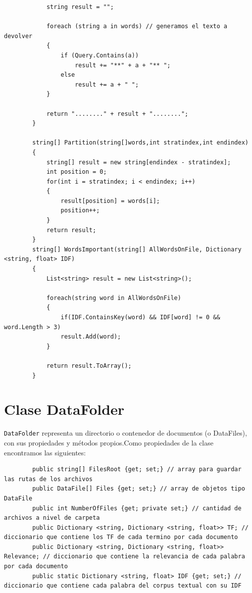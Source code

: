 \documentclass[12pt,a4paper]{report}
\begin{document}
\begin{lstlisting}
            string result = "";

            foreach (string a in words) // generamos el texto a devolver
            {
                if (Query.Contains(a))
                    result += "**" + a + "** ";
                else
                    result += a + " ";
            }

            return "........" + result + "........";
        } 

        string[] Partition(string[]words,int stratindex,int endindex)
        {
            string[] result = new string[endindex - stratindex];
            int position = 0;
            for(int i = stratindex; i < endindex; i++)
            {
                result[position] = words[i];
                position++;
            }
            return result;
        }
        string[] WordsImportant(string[] AllWordsOnFile, Dictionary <string, float> IDF)
        {
            List<string> result = new List<string>();

            foreach(string word in AllWordsOnFile)
            {   
                if(IDF.ContainsKey(word) && IDF[word] != 0 && word.Length > 3)
                result.Add(word);
            }

            return result.ToArray();
        }

\end{lstlisting}

\chapter*{Clase DataFolder}

\texttt{DataFolder} representa un directorio o contenedor de documentos (o DataFiles), con sus propiedades y métodos propios.Como propiedades de la clase encontramos las siguientes:

\begin{lstlisting}
        public string[] FilesRoot {get; set;} // array para guardar las rutas de los archivos
        public DataFile[] Files {get; set;} // array de objetos tipo DataFile
        public int NumberOfFiles {get; private set;} // cantidad de archivos a nivel de carpeta
        public Dictionary <string, Dictionary <string, float>> TF; // diccionario que contiene los TF de cada termino por cada documento
        public Dictionary <string, Dictionary <string, float>> Relevance; // diccionario que contiene la relevancia de cada palabra por cada documento 
        public static Dictionary <string, float> IDF {get; set;} // diccionario que contiene cada palabra del corpus textual con su IDF
\end{lstlisting}\bigskip
\end{document}
